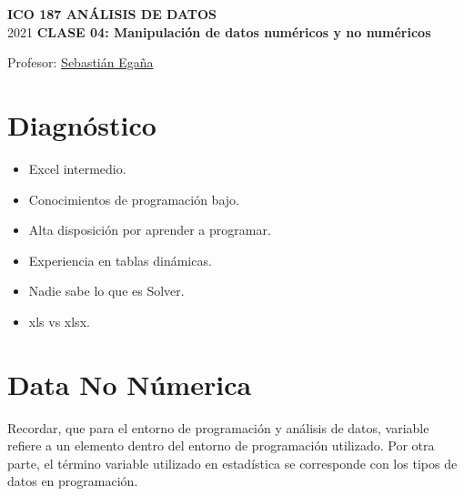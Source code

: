 \documentclass[12 pt,letterpaper]{article}
\begin{document}
%

	
	\pagestyle{fancy}
	\fancyhf{}
	\renewcommand{\headrulewidth}{0pt}
	\renewcommand{\footrulewidth}{0pt}	
	
\begin{center}
		
	\bigbreak
	\textbf{ICO 187 ANÁLISIS DE DATOS}\\
	\small{2021}
	\break
	\textbf{CLASE 04: Manipulación de datos numéricos y no numéricos}\\
\end{center}

\begin{flushright}	
		
	Profesor: \href{mailto:sebastianeganasa@santotomas.cl}{Sebastián Egaña}

\end{flushright}

\section{Diagnóstico}

\begin{itemize}
	\item Excel intermedio.
	
	\item Conocimientos de programación bajo.
	
	\item Alta disposición por aprender a programar.
	
	\item Experiencia en tablas dinámicas.
	
	\item Nadie sabe lo que es Solver.
	
	\item xls vs xlsx.	
\end{itemize}

\section{Data No Númerica}

Recordar, que para el entorno de programación y análisis de datos, variable refiere a un elemento dentro del entorno de programación utilizado. Por otra parte, el término variable utilizado en estadística se corresponde con los tipos de datos en programación. 
\end{document}
